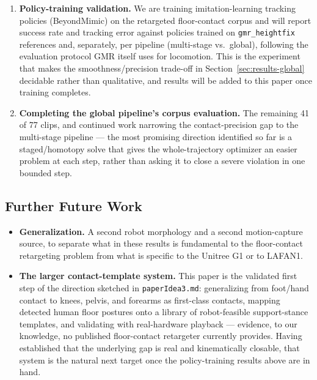 \begin{enumerate}
  \item \textbf{Policy-training validation.} We are training
    imitation-learning tracking policies (BeyondMimic) on the retargeted
    floor-contact corpus and will report success rate and tracking error
    against policies trained on \texttt{gmr\_heightfix} references and,
    separately, per pipeline (multi-stage vs.\ global), following the
    evaluation protocol GMR itself uses for locomotion. This is the
    experiment that makes the smoothness/precision trade-off in
    Section~\ref{sec:results-global} decidable rather than qualitative, and
    results will be added to this paper once training completes.
  \item \textbf{Completing the global pipeline's corpus evaluation.} The
    remaining 41 of 77 clips, and continued work narrowing the
    contact-precision gap to the multi-stage pipeline --- the most
    promising direction identified so far is a staged/homotopy solve that
    gives the whole-trajectory optimizer an easier problem at each step,
    rather than asking it to close a severe violation in one bounded step.
\end{enumerate}

\subsection{Further Future Work}
\label{sec:further-future-work}

\begin{itemize}
  \item \textbf{Generalization.} A second robot morphology and a second
    motion-capture source, to separate what in these results is
    fundamental to the floor-contact retargeting problem from what is
    specific to the Unitree G1 or to LAFAN1.
  \item \textbf{The larger contact-template system.} This paper is the
    validated first step of the direction sketched in
    \texttt{paperIdea3.md}: generalizing from foot/hand contact to knees,
    pelvis, and forearms as first-class contacts, mapping detected human
    floor postures onto a library of robot-feasible support-stance
    templates, and validating with real-hardware playback --- evidence, to
    our knowledge, no published floor-contact retargeter currently
    provides. Having established that the underlying gap is real and
    kinematically closable, that system is the natural next target once
    the policy-training results above are in hand.
\end{itemize}
